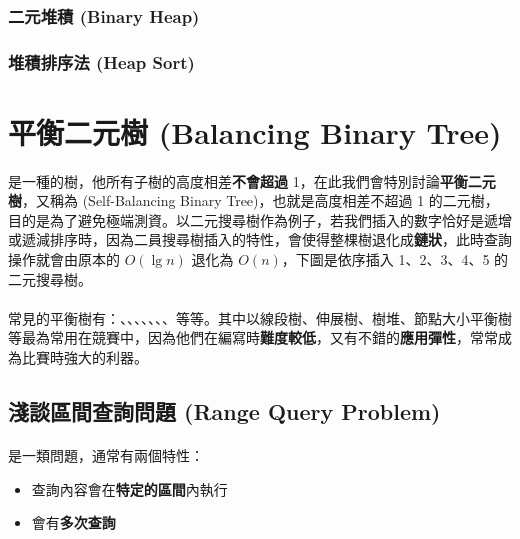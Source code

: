 \documentclass[12pt,a4paper,oneside]{report}
\begin{document}
\begin{CJK}{UTF8}{bkai}
\subsubsection{二元堆積 (Binary Heap)}
\subsubsection{堆積排序法 (Heap Sort)}

\section{平衡二元樹 (Balancing Binary Tree)}

\paragraph{} 是一種的樹，他所有子樹的高度相差\textbf{不會超過} 1，在此我們會特別討論\textbf{平衡二元樹}，又稱為\textbf{} (Self-Balancing Binary Tree)，也就是高度相差不超過 1 的二元樹，目的是為了避免極端測資。以二元搜尋樹作為例子，若我們插入的數字恰好是遞增或遞減排序時，因為二員搜尋樹插入的特性，會使得整棵樹退化成\textbf{鏈狀}，此時查詢操作就會由原本的 $O(\lg{n})$ 退化為 $O(n)$，下圖是依序插入 1、2、3、4、5 的二元搜尋樹。

\paragraph{}常見的平衡樹有：、、、、、、、等等。其中以線段樹、伸展樹、樹堆、節點大小平衡樹等最為常用在競賽中，因為他們在編寫時\textbf{難度較低}，又有不錯的\textbf{應用彈性}，常常成為比賽時強大的利器。

\subsection{淺談區間查詢問題 (Range Query Problem)}

\paragraph{} 是一類問題，通常有兩個特性：
\begin{itemize}
\item 查詢內容會在\textbf{特定的區間}內執行
\item 會有\textbf{多次查詢}
\end{itemize}

\end{CJK}
\end{document}

